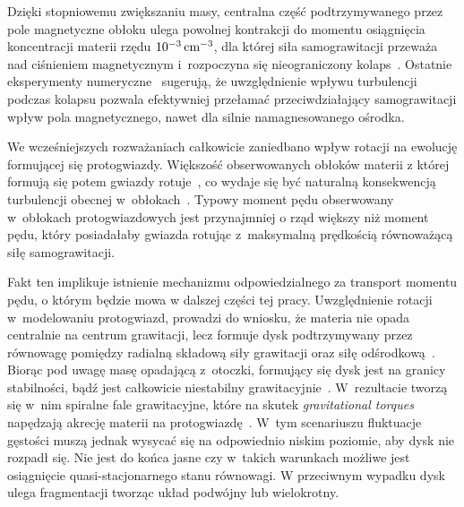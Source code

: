 Dzięki stopniowemu zwiększaniu masy, centralna część podtrzymywanego przez pole
magnetyczne obłoku ulega powolnej kontrakcji do momentu osiągnięcia koncentracji
materii rzędu $10^{-3}\hbox{$\thinspace\textrm{cm}$}^{-3}$, dla której siła samograwitacji przeważa nad
ciśnieniem magnetycznym i~rozpoczyna się nieograniczony kolaps~\cite{BM94, CB00}.
Ostatnie eksperymenty numeryczne~\cite{JHCF13} sugerują, że uwzględnienie
wpływu turbulencji podczas kolapsu pozwala efektywniej przełamać
przeciwdziałający samograwitacji wpływ pola magnetycznego, nawet dla silnie
namagnesowanego ośrodka.
\par We wcześniejszych rozważaniach całkowicie zaniedbano wpływ rotacji na
ewolucję formującej się protogwiazdy. Większość obserwowanych obłoków materii z
której formują się potem gwiazdy rotuje~\cite{GBFM93}, co wydaje się być
naturalną konsekwencją turbulencji obecnej w~obłokach~\cite{BB00}. Typowy
moment pędu obserwowany w~obłokach protogwiazdowych jest przynajmniej o rząd
większy niż moment pędu, który posiadałaby gwiazda rotując z~maksymalną
prędkością równoważącą siłę samograwitacji. 

Fakt ten implikuje istnienie
mechanizmu odpowiedzialnego za transport momentu pędu, o którym będzie mowa w
dalszej części tej pracy. Uwzględnienie rotacji w~modelowaniu protogwiazd,
prowadzi do wniosku, że materia nie opada centralnie na centrum grawitacji, lecz
formuje dysk podtrzymywany przez równowagę pomiędzy radialną składową siły
grawitacji oraz siłę odśrodkową~\cite{TSC84}. Biorąc pod uwagę
masę opadającą z~otoczki, formujący się dysk jest na granicy stabilności, bądź
jest całkowicie niestabilny grawitacyjnie~\cite{SKBT94}. W~rezultacie tworzą
się w~nim spiralne fale grawitacyjne, które na skutek \emph{gravitational
torques} napędzają akrecję materii na protogwiazdę~\cite{St00}. W~tym
scenariuszu fluktuacje gęstości muszą jednak wysycać się na odpowiednio niskim
poziomie, aby dysk nie rozpadł się. Nie jest do końca jasne czy w~takich
warunkach możliwe jest osiągnięcie quasi-stacjonarnego stanu równowagi. W
przeciwnym wypadku dysk ulega fragmentacji tworząc układ podwójny lub
wielokrotny.

